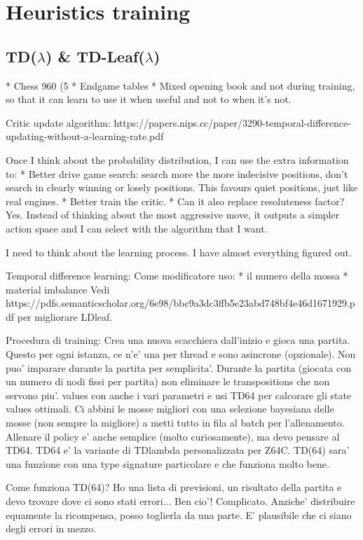 \chapter{Heuristics training}
\section{TD($\lambda$) \& TD-Leaf($\lambda$)}

* Chess 960 (5%
* Endgame tables
* Mixed opening book and not during training, so that it can learn to use it
  when useful and not to when it's not.

Critic update algorithm: https://papers.nips.cc/paper/3290-temporal-difference-updating-without-a-learning-rate.pdf

Once I think about the probability distribution, I can use the extra information
to:
* Better drive game search: search more the more indecisive positions, don't
  search in clearly winning or losely positions. This favours quiet positions,
  just like real engines.
* Better train the critic.
* Can it also replace resoluteness factor? Yes. Instead of thinking about the
  most aggressive move, it outputs a simpler action space and I can select with
  the algorithm that I want.

I need to think about the learning process. I have almost everything figured
out.

Temporal difference learning:
Come modificatore uso:
* il numero della mossa
* material imbalance
Vedi
https://pdfs.semanticscholar.org/6e98/bbc9a3dc3ffb5e23abd748bf4e46d1671929.pdf
per migliorare LDleaf.

Procedura di training:
Crea una nuova scacchiera dall'inizio e gioca una partita. Questo per ogni
istanza, ce n'e' una per thread e sono asincrone (opzionale). Non puo' imparare
durante la partita per semplicita'. Durante la partita (giocata con un numero di
nodi fissi per partita) non eliminare le transpositions che non servono piu'.
values con anche i vari parametri e usi TD64 per calcorare gli state values
ottimali. Ci abbini le mosse migliori con una selezione bayesiana delle mosse
(non sempre la migliore) a metti tutto in fila al batch per l'allenamento.
Allenare il policy e' anche semplice (molto curiosamente), ma devo pensare al
TD64. TD64 e' la variante di TDlambda personalizzata per Z64C. TD(64) sara' una
funzione con una type signature particolare e che funziona molto bene.

Come funziona TD(64)?
Ho una lista di previsioni, un risultato della partita e devo trovare dove ci
sono stati errori... Ben cio'! Complicato. Anziche' distribuire equamente la
ricompensa, posso toglierla da una parte. E' plausibile che ci siano degli
errori in mezzo.

